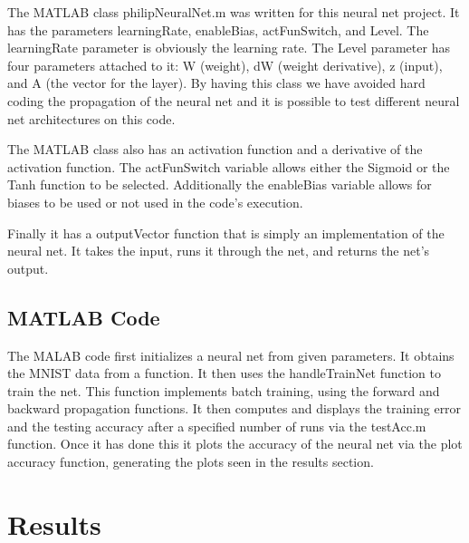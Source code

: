 \documentclass[12pt]{article}
\begin{document}
	
	The MATLAB class philipNeuralNet.m was written for this neural net project. It has the parameters learningRate, enableBias, actFunSwitch, and Level. The learningRate parameter is obviously the learning rate. The Level parameter has four parameters attached to it: W (weight), dW (weight derivative),  z (input), and A (the vector for the layer). By having this class we have avoided hard coding the propagation of the neural net and it is possible to test different neural net architectures on this code. \par 
	
	The MATLAB class also has an activation function and a derivative of the activation function. The actFunSwitch variable allows either the Sigmoid or the Tanh function to be selected. Additionally the enableBias variable allows for biases to be used or not used in the code's execution. \par 
	Finally it has a outputVector function that is simply an implementation of the neural net. It takes the input, runs it through the net, and returns the net's output. \par 
	
	
	
	\subsection{MATLAB Code}
	The MALAB code first initializes a neural net from given parameters. It obtains the MNIST data from a function\cite{usingMNIST}. It then uses the handleTrainNet function to train the net. This function implements batch training, using the forward and backward propagation functions. It then computes and displays the training error and the testing accuracy after a specified number of runs via the testAcc.m function. Once it has done this it plots the accuracy of the neural net via the plot accuracy function, generating the plots seen in the results section.
	 
	
	
	\section{Results}
\end{document}
